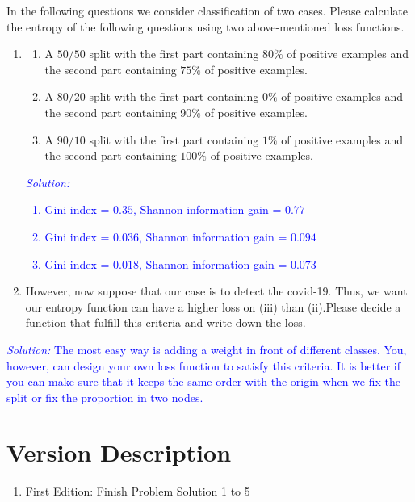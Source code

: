 \documentclass{article}
\def\solColor{blue}
\begin{document}
In the following questions we consider classification of two cases. Please calculate the entropy of the following questions using two above-mentioned loss functions.
\begin{enumerate}[label=(\alph*)]
\item 
\begin{enumerate}[label=(\roman*)]
    \item A $50/50$ split with the first part containing $80 \%$ of positive examples and the second part containing $75 \%$ of positive examples.
    \item A $80/20$ split with the first part containing $0 \%$ of positive examples and the second part containing $90 \%$ of positive examples.
    \item A $90/10$ split with the first part containing $1 \%$ of positive examples and the second part containing $100 \%$ of positive examples.
\end{enumerate}
\textcolor{\solColor}{\textit{Solution:}
\begin{enumerate}[label=(\roman*)]
    \item Gini index = $0.35$, Shannon information gain = $0.77$
    \item Gini index = $0.036$, Shannon information gain = $0.094$
    \item Gini index = $0.018$, Shannon information gain = $0.073$
\end{enumerate}
}
\item However, now suppose that our case is to detect the covid-19. Thus, we want our entropy function can have a higher loss on (iii) than (ii).Please decide a function that fulfill this criteria and write down the loss.
\end{enumerate}

\textcolor{\solColor}{\textit{Solution:}
The most easy way is adding a weight in front of different classes. You, however, can design your own loss function to satisfy this criteria. It is better if you can make sure that it keeps the same order with the origin when we fix the split or fix the proportion in two nodes. 
}
 \section*{Version Description}
 \begin{enumerate}
     \item First Edition: Finish Problem Solution 1 to 5
 \end{enumerate}
\end{document}

